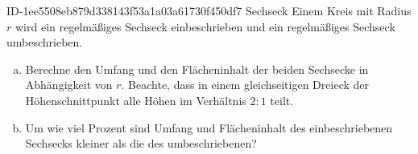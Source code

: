 \begin{exercise}
      {ID-1ee5508eb879d338143f53a1a03a61730f450df7}
      {Sechseck}
  \ifproblem\problem
    Einem Kreis mit Radius $r$ wird ein regelmäßiges Sechseck einbeschrieben und
    ein regelmäßiges Sechseck umbeschrieben.\par
    \begin{minipage}{0.35\textwidth}
      \centering
    \end{minipage}\hfill
    \begin{minipage}{0.64\textwidth}
      \begin{enumerate}[a)]
        \item Berechne den Umfang und den Flächeninhalt der beiden Sechsecke in
              Abhängigkeit von $r$. Beachte, dass in einem gleichseitigen Dreieck
              der Höhenschnittpunkt alle Höhen im Verhältnis $2:1$ teilt.
        \item Um wie viel Prozent sind Umfang und Flächeninhalt des einbeschriebenen
              Sechsecks kleiner als die des umbeschriebenen?
      \end{enumerate}
    \end{minipage}
  \fi
\end{exercise}
